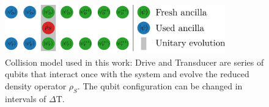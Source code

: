 \begin{figure}
	\centering
	\includegraphics[width=0.85\textwidth]{img/coll2}
	\caption{Collision model used in this work: Drive and Transducer are series of qubits that interact once with the system and evolve the reduced density operator $\rho_S$. The qubit configuration can be changed in intervals of $\Delta \mathrm{T}$.}
	\label{collmodel}
\end{figure}